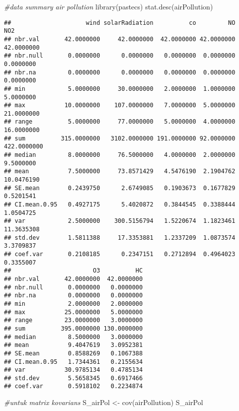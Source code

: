 \documentclass[
]{article}
\newenvironment{Shaded}{\begin{snugshade}}{\end{snugshade}}
\newcommand{\CommentTok}[1]{\textcolor[rgb]{0.56,0.35,0.01}{\textit{#1}}}
\newcommand{\FunctionTok}[1]{\textcolor[rgb]{0.00,0.00,0.00}{#1}}
\newcommand{\NormalTok}[1]{#1}
\newcommand{\OtherTok}[1]{\textcolor[rgb]{0.56,0.35,0.01}{#1}}
\begin{document}
\begin{Shaded}
\begin{Highlighting}[]
\CommentTok{\#data summary air pollution}
\FunctionTok{library}\NormalTok{(pastecs)}
\FunctionTok{stat.desc}\NormalTok{(airPollution)}
\end{Highlighting}
\end{Shaded}

\begin{verbatim}
##                     wind solarRadiation          co         NO         NO2
## nbr.val       42.0000000     42.0000000  42.0000000 42.0000000  42.0000000
## nbr.null       0.0000000      0.0000000   0.0000000  0.0000000   0.0000000
## nbr.na         0.0000000      0.0000000   0.0000000  0.0000000   0.0000000
## min            5.0000000     30.0000000   2.0000000  1.0000000   5.0000000
## max           10.0000000    107.0000000   7.0000000  5.0000000  21.0000000
## range          5.0000000     77.0000000   5.0000000  4.0000000  16.0000000
## sum          315.0000000   3102.0000000 191.0000000 92.0000000 422.0000000
## median         8.0000000     76.5000000   4.0000000  2.0000000   9.5000000
## mean           7.5000000     73.8571429   4.5476190  2.1904762  10.0476190
## SE.mean        0.2439750      2.6749085   0.1903673  0.1677829   0.5201541
## CI.mean.0.95   0.4927175      5.4020872   0.3844545  0.3388444   1.0504725
## var            2.5000000    300.5156794   1.5220674  1.1823461  11.3635308
## std.dev        1.5811388     17.3353881   1.2337209  1.0873574   3.3709837
## coef.var       0.2108185      0.2347151   0.2712894  0.4964023   0.3355007
##                       O3          HC
## nbr.val       42.0000000  42.0000000
## nbr.null       0.0000000   0.0000000
## nbr.na         0.0000000   0.0000000
## min            2.0000000   2.0000000
## max           25.0000000   5.0000000
## range         23.0000000   3.0000000
## sum          395.0000000 130.0000000
## median         8.5000000   3.0000000
## mean           9.4047619   3.0952381
## SE.mean        0.8588269   0.1067388
## CI.mean.0.95   1.7344361   0.2155634
## var           30.9785134   0.4785134
## std.dev        5.5658345   0.6917466
## coef.var       0.5918102   0.2234874
\end{verbatim}

\begin{Shaded}
\begin{Highlighting}[]
\CommentTok{\#untuk matrix kovarians}
\NormalTok{S\_airPol }\OtherTok{\textless{}{-}} \FunctionTok{cov}\NormalTok{(airPollution)}
\NormalTok{S\_airPol}
\end{Highlighting}
\end{Shaded}
\end{document}
